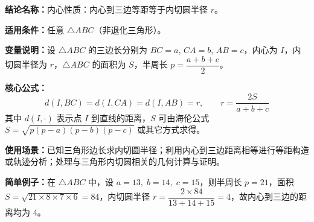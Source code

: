 \textbf{结论名称：}内心性质：内心到三边等距等于内切圆半径 \(r\)。

\textbf{适用条件：}任意 \(\triangle ABC\)（非退化三角形）。

\textbf{变量说明：}设 \(\triangle ABC\) 的三边长分别为 \(BC=a\), \(CA=b\), \(AB=c\)，内心为 \(I\)，内切圆半径为 \(r\)，\(\triangle ABC\) 的面积为 \(S\)，半周长 \(p=\dfrac{a+b+c}{2}\)。

\textbf{核心公式：}
\[
\boxed{d(I,BC)=d(I,CA)=d(I,AB)=r},\qquad 
\boxed{r = \frac{2S}{a+b+c}}
\]
其中 \(d(I,\cdot)\) 表示点 \(I\) 到直线的距离，\(S\) 可由海伦公式 \(S=\sqrt{p(p-a)(p-b)(p-c)}\) 或其它方式求得。

\textbf{使用场景：}已知三角形边长求内切圆半径；利用内心到三边距离相等进行等距构造或轨迹分析；处理与三角形内切圆相关的几何计算与证明。

\textbf{简单例子：}在 \(\triangle ABC\) 中，设 \(a=13,\;b=14,\;c=15\)，则半周长 \(p=21\)，面积 \(S=\sqrt{21\times8\times7\times6}=84\)，内切圆半径 \(r=\dfrac{2\times84}{13+14+15}=4\)，故内心到三边的距离均为 \(4\)。